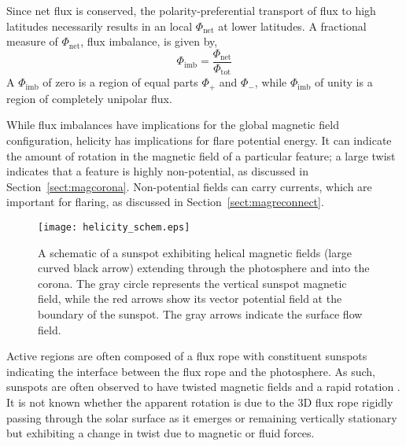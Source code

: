 Since net flux is conserved, the polarity-preferential transport of flux to high latitudes necessarily results in an local $\Phi_{\mathrm{net}}$ at lower latitudes. A fractional measure of $\Phi_{\mathrm{net}}$, flux imbalance, is given by,
\begin{equation}
\Phi_{\mathrm{imb}} = \frac{\Phi_{\mathrm{net}}}{\Phi_{\mathrm{tot}}}  
\end{equation}
A $\Phi_{\mathrm{imb}}$ of zero is a region of equal parts $\Phi_{+}$ and $\Phi_{-}$, while $\Phi_{\mathrm{imb}}$ of unity is a region of completely unipolar flux. %

While flux imbalances have implications for the global magnetic field configuration, helicity has implications for flare potential energy. It can indicate the amount of rotation in the magnetic field of a particular feature; a large twist indicates that a feature is highly non-potential, as discussed in Section~\ref{sect:magcorona}. Non-potential fields can carry currents, which are important for flaring, as discussed in Section~\ref{sect:magreconnect}. 

\begin{figure}[!t]
\centerline{\texttt{[image: helicity\_schem.eps]}}
\caption[A schematic of helicity within a sunspot.]{A schematic of a sunspot exhibiting helical magnetic fields (large curved black arrow) extending through the photosphere and into the corona. The gray circle represents the vertical sunspot magnetic field, while the red arrows show its vector potential field at the boundary of the sunspot.  The gray arrows indicate the surface flow field.}
\label{fig:helicity_schem}
\end{figure}

Active regions are often composed of a flux rope with constituent sunspots indicating the interface between the flux rope and the photosphere. As such, sunspots are often observed to have twisted magnetic fields and a rapid rotation \citep[up to $200^\circ$ in 3\,--\,5 days;][]{Brown:2003}. It is not known whether the apparent rotation is due to the 3D flux rope rigidly passing through the solar surface as it emerges or remaining vertically stationary but exhibiting a change in twist due to magnetic or fluid forces. 

